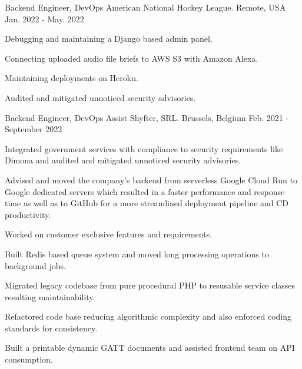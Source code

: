 

\begin{cventries}

  \cventry
    {Backend Engineer, DevOps} %
    {American National Hockey League.} %
    {Remote, USA} %
    {Jan. 2022 - May. 2022} %
    {
      \begin{cvitems} %
        \item {Debugging and maintaining a Django based admin panel.}
        \item {Connecting uploaded audio file briefs to AWS S3 with Amazon Alexa.}
        \item {Maintaining deployments on Heroku.}
        \item {Audited and mitigated unnoticed security advisories.}
      \end{cvitems}
    }

  \cventry
    {Backend Engineer, DevOps Assist} %
    {Shyfter, SRL.} %
    {Brussels, Belgium} %
    {Feb. 2021 - September 2022} %
    {
      \begin{cvitems} %
        \item {Integrated government services with compliance to security requirements like Dimona and audited and mitigated unnoticed security advisories.}
        \item {Advised and moved the company's backend from serverless Google Cloud Run to Google dedicated servers which resulted in a faster performance and response time as well as to GitHub for a more streamlined deployment pipeline and CD productivity.}
        \item {Worked on customer exclusive features and requirements.}
        \item {Built Redis based queue system and moved long processing operations to background jobs.}
        \item {Migrated legacy codebase from pure procedural PHP to resusable service classes resulting maintainability.}
        \item {Refactored code base reducing algorithmic complexity and also enforced coding standards for consistency.}
        \item {Built a printable dynamic GATT documents and assisted frontend team on API consumption.}
      \end{cvitems}
    }


\end{cventries}
